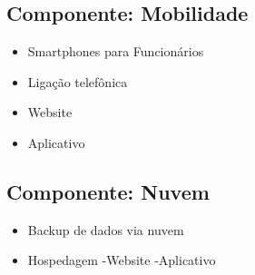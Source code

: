     \subsection{Componente: Mobilidade}
 \begin{itemize}
 \item Smartphones para Funcionários
   \item Ligação telefônica
  \item Website
  \item Aplicativo
  \end{itemize}

     \subsection{Componente: Nuvem}
 \begin{itemize}
 \item Backup de dados via nuvem
   \item Hospedagem
  \subitem -Website
  \subitem -Aplicativo

\end{itemize}

